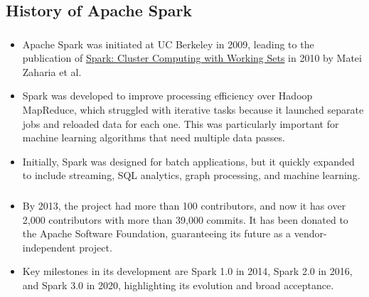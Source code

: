 \subsection{History of Apache Spark}
\begin{frame}
\frametitle{\subsecname}
\begin{itemize}
    \item Apache Spark was initiated at UC Berkeley in 2009, leading to the publication of \href{https://www1.icsi.berkeley.edu/pubs/networking/ICSI_sparkclustercomputing10.pdf}{Spark: Cluster Computing with Working Sets} in 2010 by Matei Zaharia et al.  \pause
    \item Spark was developed to improve processing efficiency over Hadoop MapReduce, which struggled with iterative tasks because it launched separate jobs and reloaded data for each one. This was particularly important for machine learning algorithms that need multiple data passes. \pause
    \item Initially, Spark was designed for batch applications, but it quickly expanded to include streaming, SQL analytics, graph processing, and machine learning. \pause
\end{itemize}
\end{frame}
\begin{frame}
\frametitle{\subsecname}
\begin{itemize}
    \item By 2013, the project had more than 100 contributors, and now it has over 2,000 contributors with more than 39,000 commits. It has been donated to the Apache Software Foundation, guaranteeing its future as a vendor-independent project. \pause
    \item Key milestones in its development are Spark 1.0 in 2014, Spark 2.0 in 2016, and Spark 3.0 in 2020, highlighting its evolution and broad acceptance. \pause
\end{itemize}
\end{frame}

